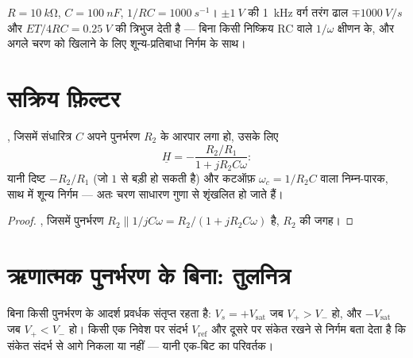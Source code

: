 \begin{example}[वर्ग से त्रिभुज]\label{ex:b1:operational-amplifier:triangle}
$R = \qty{10}{k\ohm}$, $C = \qty{100}{nF}$, $1/RC = \qty{1000}{s^{-1}}$।
$\pm\qty{1}{V}$ की \qty{1}{kHz} वर्ग तरंग ढाल
$\mp\qty{1000}{V/s}$ और  $ET/4RC = \qty{0.25}{V}$ की त्रिभुज देती है ---
बिना किसी निष्क्रिय RC वाले $1/\omega$ क्षीणन के, और अगले चरण को खिलाने के
लिए शून्य-प्रतिबाधा निर्गम के साथ।
\end{example}

\section{सक्रिय फ़िल्टर}

\begin{proposition}[प्रथम कोटि का सक्रिय निम्न-पारक]\label{prop:b1:operational-amplifier:activelp}
, जिसमें संधारित्र $C$ अपने पुनर्भरण  $R_2$ के
आरपार लगा हो, उसके लिए
\[
\underline H = -\frac{R_2/R_1}{1 + jR_2C\omega}:
\]
यानी दिष्ट  $-R_2/R_1$ (जो $1$ से बड़ी हो सकती है) और कटऑफ़
$\omega_c = 1/R_2C$ वाला निम्न-पारक, साथ में शून्य निर्गम  --- अतः
चरण साधारण गुणा से शृंखलित हो जाते हैं।
\end{proposition}

\begin{proof}
, जिसमें पुनर्भरण  $R_2 \parallel 1/jC\omega
= R_2/(1 + jR_2C\omega)$ है, $R_2$ की जगह।
\end{proof}

\section{ऋणात्मक पुनर्भरण के बिना: तुलनित्र}

\begin{proposition}[तुलनित्र]\label{prop:b1:operational-amplifier:comparator}
बिना किसी पुनर्भरण के आदर्श प्रवर्धक संतृप्त रहता है:
$V_s = +V_{\mathrm{sat}}$ जब $V_+ > V_-$ हो, और
$-V_{\mathrm{sat}}$ जब $V_+ < V_-$ हो। किसी एक निवेश पर संदर्भ $V_{\mathrm{ref}}$
और दूसरे पर संकेत रखने से निर्गम बता देता है कि संकेत संदर्भ से आगे निकला या
नहीं --- यानी एक-बिट का परिवर्तक।
\end{proposition}

